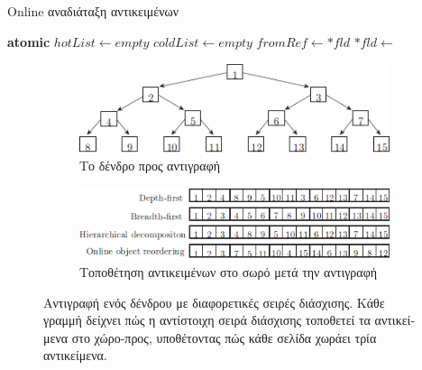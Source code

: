 \begin{greek}
\begin{algorithm}
  \caption{Online αναδιάταξη αντικειμένων}
  \label{alg:cop_5}
  \begin{algorithmic}[1]
      \State \textbf{atomic}
      \State {}
      \State {}
        \State {}
      \EndFor
      \Repeat
          \State {}
        \EndWhile
          \State {}
        \EndWhile
    \EndProcedure
    \Statex
      \State $hotList \gets empty$
      \State $coldList \gets empty$
    \EndProcedure
    \Statex
      \State $fromRef \gets *fld$
        \State $*fld \gets$ 
      \EndIf
    \EndProcedure
    \Statex
          \State {}
        \Else
          \State {}
        \EndIf
      \EndFor
    \EndProcedure
  \end{algorithmic}
\end{algorithm}

\begin{figure}
  \centering
  \begin{subfigure}{1.0\textwidth}
    \includegraphics{figures/cop_3a}
    \caption{Το δένδρο προς αντιγραφή}
  \end{subfigure}

  \begin{subfigure}[b]{1.0\textwidth}
    \includegraphics{figures/cop_3b}
    \caption{Τοποθέτηση αντικειμένων στο σωρό μετά την αντιγραφή}
  \end{subfigure}
  \caption[Αντιγραφή ενός δένδρου με διαφορετικές σειρές διάσχισης]
    {Αντιγραφή ενός δένδρου με διαφορετικές σειρές διάσχισης.
     Κάθε γραμμή δείχνει πώς η αντίστοιχη σειρά διάσχισης τοποθετεί
     τα αντικείμενα στο χώρο-προς, υποθέτοντας πώς κάθε σελίδα
     χωράει τρία αντικείμενα.}
  \label{fig:cop_3}
\end{figure}


\end{greek}
